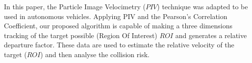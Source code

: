 In this paper, the Particle Image Velocimetry ($PIV$) technique was adapted to be used in autonomous vehicles.
Applying PIV and the Pearson’s Correlation Coefficient, our proposed algorithm 
is capable of making a three dimensions tracking of the target possible (Region Of Interest) $ROI$ 
and generates a relative departure factor. These data are used to estimate the 
relative velocity of the target ($ROI$) and then analyse the collision risk.